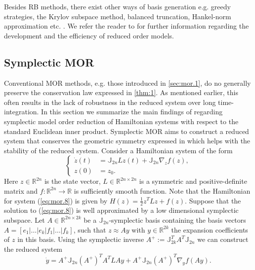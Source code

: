 Besides RB methods, there exist other ways of basis generation e.g. greedy strategies, the Krylov subspace method, balanced truncation, Hankel-norm approximation etc. \cite{antoulas2005approximation}. We refer the reader to \cite{hesthaven2015certified,quarteroni2015reduced,Haasdonk2017} for further information regarding the development and the efficiency of reduced order models. 

\subsection{Symplectic MOR} \label{sec:mor.2}
Conventional MOR methods, e.g. those introduced in \cref{sec:mor.1}, do no generally preserve the conservation law expressed in \cref{thm:1}. As mentioned earlier, this often results in the lack of robustness in the reduced system over long time-integration. In this section we summarize the main findings of \cite{doi:10.1137/17M1111991} regarding symplectic model order reduction of Hamiltonian systems with respect to the standard Euclidean inner product. Symplectic MOR aims to construct a reduced system that conserves the geometric symmetry expressed in  which helps with the stability of the reduced system.
Consider a Hamiltonian system of the form
\begin{equation} \label{eq:mor.8}
\left\{
\begin{aligned}
	\dot z(t) &= \mathbb J_{2n} L z(t) + \mathbb J_{2n} \nabla_z f(z), \\
	z(0) &= z_0.
\end{aligned}
\right.
\end{equation}
Here $z\in \mathbb R^{2n}$ is the state vector, $L\in\mathbb R^{2n\times 2n}$ is a symmetric and positive-definite matrix and $f:\mathbb R^{2n}\to\mathbb R$ is sufficiently smooth function. Note that the Hamiltonian for system (\ref{eq:mor.8}) is given by $H(z) = \frac 1 2 z^TLz + f(z)$. Suppose that the solution to (\ref{eq:mor.8}) is well approximated by a low dimensional symplectic subspace. Let $A\in \mathbb{R}^{2n\times 2k}$ be a $\mathbb{J}_{2n}$-symplectic basis containing the basis vectors $A=[e_1|\dots|e_k|f_1|\dots|f_k]$, such that $z \approx Ay$ with $y \in \mathbb{R}^{2k}$ the expansion coefficients of $z$ in this basis. Using the symplectic inverse $A^+ := \mathbb J_{2k}^T A^T \mathbb J_{2n}$ we can construct the reduced system
\begin{equation} \label{eq:mor.9}
	\dot y = A^+ \mathbb J_{2n} (A^+)^T A^T L A y + A^+ \mathbb J_{2n} (A^+)^T \nabla_y f(Ay).
\end{equation}
